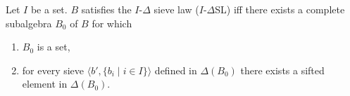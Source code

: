 Let $I$ be a set. $B$ satisfies the $I$-$\Delta$ sieve law ($I$-$\Delta$SL) iff there exists a complete subalgebra $B_0$ of $B$ for which
\begin{enumerate}
\item $B_0$ is a set,
\item for every sieve $\langle b', \{b_i \mid i \in I\} \rangle$ defined in $\Delta(B_0)$ there exists a sifted element in $\Delta(B_0)$.
\end{enumerate}
